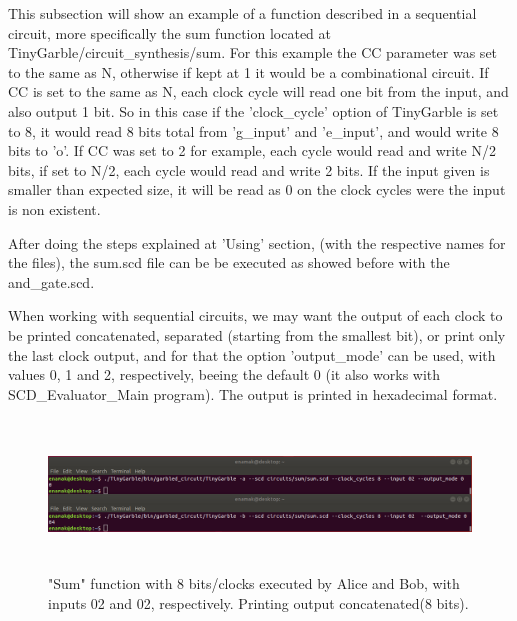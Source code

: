 \begin{refsection}
This subsection will show an example of a function described in a sequential circuit, more specifically the sum function located at TinyGarble/circuit\_synthesis/sum. For this example the CC parameter was set to the same as N, otherwise if kept at 1 it would be a combinational circuit. If CC is set to the same as N, each clock cycle will read one bit from the input, and also output 1 bit. So in this case if the 'clock\_cycle' option of TinyGarble is set to 8, it would read 8 bits total from 'g\_input' and 'e\_input', and would write 8 bits to 'o'. If CC was set to 2 for example, each cycle would read and write N/2 bits, if set to N/2, each cycle would read and write 2 bits. If the input given is smaller than expected size, it will be read as 0 on the clock cycles were the input is non existent.

After doing the steps explained at 'Using' section, (with the respective names for the files), the sum.scd file can be be executed as showed before with the and\_gate.scd.

When working with sequential circuits, we may want the output of each clock to be printed concatenated, separated (starting from the smallest bit), or print only the last clock output, and for that the option 'output\_mode' can be used, with values 0, 1 and 2, respectively, beeing the default 0 (it also works with SCD\_Evaluator\_Main program). The output is printed in hexadecimal format.

\begin{figure}[H]
	\centering
	\includegraphics[width=1\textwidth, height=4cm]{./sdf/tiny_garble/figures/tinygarble_sum_0.png}
    \caption{"Sum" function with 8 bits/clocks executed by Alice and Bob, with inputs 02 and 02, respectively. Printing output concatenated(8 bits).}\label{fig:tinygarble_sum_0}
\end{figure}


\end{refsection}
